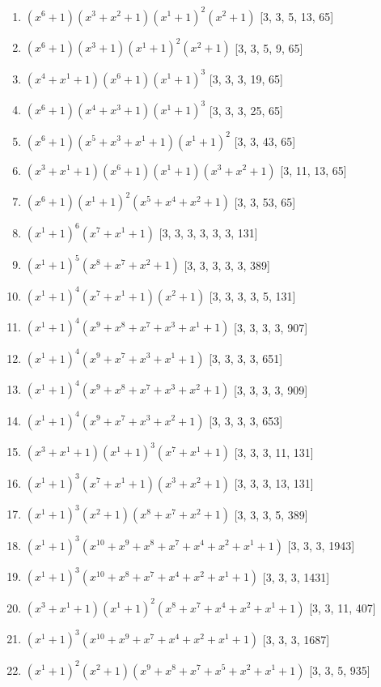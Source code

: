 \documentclass[10pt,twocolumn]{article}
\begin{document}
\begin{enumerate}
\item $(x^{6} + 1)(x^{3} + x^{2} + 1)(x^{1} + 1)^{2}(x^{2} + 1)$  [3, 3, 5, 13, 65]
\item $(x^{6} + 1)(x^{3} + 1)(x^{1} + 1)^{2}(x^{2} + 1)$  [3, 3, 5, 9, 65]
\item $(x^{4} + x^{1} + 1)(x^{6} + 1)(x^{1} + 1)^{3}$  [3, 3, 3, 19, 65]
\item $(x^{6} + 1)(x^{4} + x^{3} + 1)(x^{1} + 1)^{3}$  [3, 3, 3, 25, 65]
\item $(x^{6} + 1)(x^{5} + x^{3} + x^{1} + 1)(x^{1} + 1)^{2}$  [3, 3, 43, 65]
\item $(x^{3} + x^{1} + 1)(x^{6} + 1)(x^{1} + 1)(x^{3} + x^{2} + 1)$  [3, 11, 13, 65]
\item $(x^{6} + 1)(x^{1} + 1)^{2}(x^{5} + x^{4} + x^{2} + 1)$  [3, 3, 53, 65]
\item $(x^{1} + 1)^{6}(x^{7} + x^{1} + 1)$  [3, 3, 3, 3, 3, 3, 131]
\item $(x^{1} + 1)^{5}(x^{8} + x^{7} + x^{2} + 1)$  [3, 3, 3, 3, 3, 389]
\item $(x^{1} + 1)^{4}(x^{7} + x^{1} + 1)(x^{2} + 1)$  [3, 3, 3, 3, 5, 131]
\item $(x^{1} + 1)^{4}(x^{9} + x^{8} + x^{7} + x^{3} + x^{1} + 1)$  [3, 3, 3, 3, 907]
\item $(x^{1} + 1)^{4}(x^{9} + x^{7} + x^{3} + x^{1} + 1)$  [3, 3, 3, 3, 651]
\item $(x^{1} + 1)^{4}(x^{9} + x^{8} + x^{7} + x^{3} + x^{2} + 1)$  [3, 3, 3, 3, 909]
\item $(x^{1} + 1)^{4}(x^{9} + x^{7} + x^{3} + x^{2} + 1)$  [3, 3, 3, 3, 653]
\item $(x^{3} + x^{1} + 1)(x^{1} + 1)^{3}(x^{7} + x^{1} + 1)$  [3, 3, 3, 11, 131]
\item $(x^{1} + 1)^{3}(x^{7} + x^{1} + 1)(x^{3} + x^{2} + 1)$  [3, 3, 3, 13, 131]
\item $(x^{1} + 1)^{3}(x^{2} + 1)(x^{8} + x^{7} + x^{2} + 1)$  [3, 3, 3, 5, 389]
\item $(x^{1} + 1)^{3}(x^{10} + x^{9} + x^{8} + x^{7} + x^{4} + x^{2} + x^{1} + 1)$  [3, 3, 3, 1943]
\item $(x^{1} + 1)^{3}(x^{10} + x^{8} + x^{7} + x^{4} + x^{2} + x^{1} + 1)$  [3, 3, 3, 1431]
\item $(x^{3} + x^{1} + 1)(x^{1} + 1)^{2}(x^{8} + x^{7} + x^{4} + x^{2} + x^{1} + 1)$  [3, 3, 11, 407]
\item $(x^{1} + 1)^{3}(x^{10} + x^{9} + x^{7} + x^{4} + x^{2} + x^{1} + 1)$  [3, 3, 3, 1687]
\item $(x^{1} + 1)^{2}(x^{2} + 1)(x^{9} + x^{8} + x^{7} + x^{5} + x^{2} + x^{1} + 1)$  [3, 3, 5, 935]

\end{enumerate}
\end{document}
